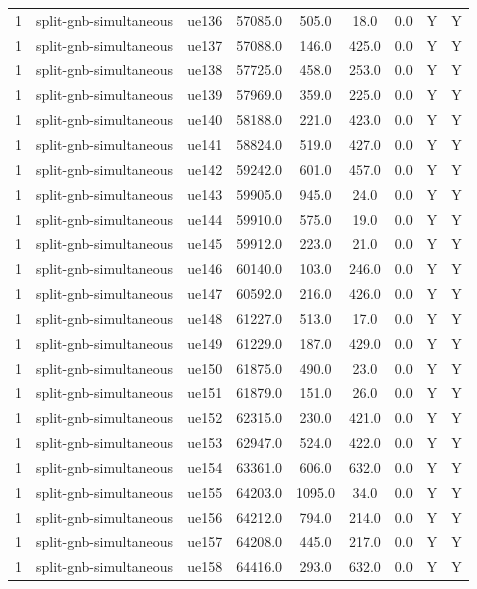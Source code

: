 \begin{table}[ht]
\begin{tabular}{|c|c|c|c|c|c|c|c|c|}
1 & split-gnb-simultaneous & ue136 & 57085.0 & 505.0 & 18.0 & 0.0 & Y & Y \\
1 & split-gnb-simultaneous & ue137 & 57088.0 & 146.0 & 425.0 & 0.0 & Y & Y \\
1 & split-gnb-simultaneous & ue138 & 57725.0 & 458.0 & 253.0 & 0.0 & Y & Y \\
1 & split-gnb-simultaneous & ue139 & 57969.0 & 359.0 & 225.0 & 0.0 & Y & Y \\
1 & split-gnb-simultaneous & ue140 & 58188.0 & 221.0 & 423.0 & 0.0 & Y & Y \\
1 & split-gnb-simultaneous & ue141 & 58824.0 & 519.0 & 427.0 & 0.0 & Y & Y \\
1 & split-gnb-simultaneous & ue142 & 59242.0 & 601.0 & 457.0 & 0.0 & Y & Y \\
1 & split-gnb-simultaneous & ue143 & 59905.0 & 945.0 & 24.0 & 0.0 & Y & Y \\
1 & split-gnb-simultaneous & ue144 & 59910.0 & 575.0 & 19.0 & 0.0 & Y & Y \\
1 & split-gnb-simultaneous & ue145 & 59912.0 & 223.0 & 21.0 & 0.0 & Y & Y \\
1 & split-gnb-simultaneous & ue146 & 60140.0 & 103.0 & 246.0 & 0.0 & Y & Y \\
1 & split-gnb-simultaneous & ue147 & 60592.0 & 216.0 & 426.0 & 0.0 & Y & Y \\
1 & split-gnb-simultaneous & ue148 & 61227.0 & 513.0 & 17.0 & 0.0 & Y & Y \\
1 & split-gnb-simultaneous & ue149 & 61229.0 & 187.0 & 429.0 & 0.0 & Y & Y \\
1 & split-gnb-simultaneous & ue150 & 61875.0 & 490.0 & 23.0 & 0.0 & Y & Y \\
1 & split-gnb-simultaneous & ue151 & 61879.0 & 151.0 & 26.0 & 0.0 & Y & Y \\
1 & split-gnb-simultaneous & ue152 & 62315.0 & 230.0 & 421.0 & 0.0 & Y & Y \\
1 & split-gnb-simultaneous & ue153 & 62947.0 & 524.0 & 422.0 & 0.0 & Y & Y \\
1 & split-gnb-simultaneous & ue154 & 63361.0 & 606.0 & 632.0 & 0.0 & Y & Y \\
1 & split-gnb-simultaneous & ue155 & 64203.0 & 1095.0 & 34.0 & 0.0 & Y & Y \\
1 & split-gnb-simultaneous & ue156 & 64212.0 & 794.0 & 214.0 & 0.0 & Y & Y \\
1 & split-gnb-simultaneous & ue157 & 64208.0 & 445.0 & 217.0 & 0.0 & Y & Y \\
1 & split-gnb-simultaneous & ue158 & 64416.0 & 293.0 & 632.0 & 0.0 & Y & Y \\

\end{tabular}
\end{table}
